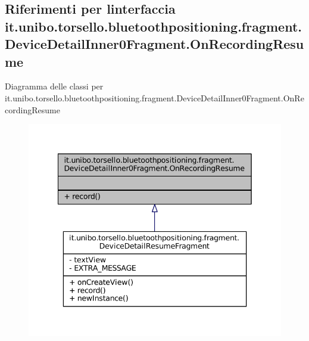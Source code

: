 \hypertarget{interfaceit_1_1unibo_1_1torsello_1_1bluetoothpositioning_1_1fragment_1_1DeviceDetailInner0Fragment_1_1OnRecordingResume}{}\subsection{Riferimenti per l\textquotesingle{}interfaccia it.\+unibo.\+torsello.\+bluetoothpositioning.\+fragment.\+Device\+Detail\+Inner0\+Fragment.\+On\+Recording\+Resume}
\label{interfaceit_1_1unibo_1_1torsello_1_1bluetoothpositioning_1_1fragment_1_1DeviceDetailInner0Fragment_1_1OnRecordingResume}


Diagramma delle classi per it.\+unibo.\+torsello.\+bluetoothpositioning.\+fragment.\+Device\+Detail\+Inner0\+Fragment.\+On\+Recording\+Resume
\nopagebreak
\begin{figure}[H]
\begin{center}
\leavevmode
\includegraphics[width=342pt]{interfaceit_1_1unibo_1_1torsello_1_1bluetoothpositioning_1_1fragment_1_1DeviceDetailInner0Fragme43535f1396450c17cd5f3da229ebde14}
\end{center}
\end{figure}


